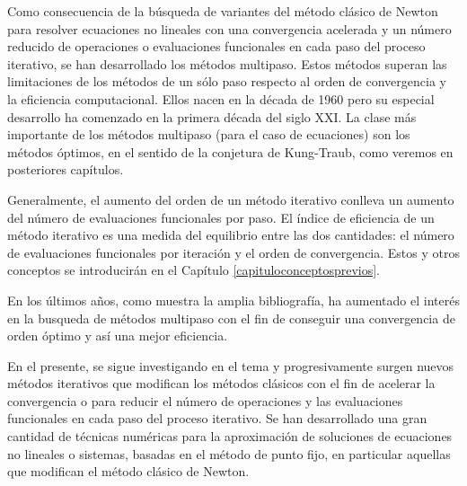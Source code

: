 Como consecuencia de la búsqueda de variantes del método clásico de Newton para resolver ecuaciones no
lineales con una convergencia acelerada y un número reducido de operaciones o evaluaciones funcionales en
cada paso del proceso iterativo, se han desarrollado los métodos multipaso. Estos métodos superan las limitaciones de los métodos de un sólo paso respecto al orden
de convergencia y la eficiencia computacional. Ellos nacen en la década de 1960 pero su especial desarrollo ha
comenzado en la primera década del siglo XXI. La clase más importante de los métodos multipaso (para el caso de ecuaciones) son los
métodos óptimos, en el sentido de la conjetura de Kung-Traub, como veremos en posteriores capítulos.

Generalmente, el aumento del orden de un método iterativo conlleva un aumento del número de evaluaciones
funcionales por paso. El índice de eficiencia de un método iterativo es una medida del equilibrio entre las dos cantidades: el número de
evaluaciones funcionales por iteración y el orden de convergencia. Estos y otros conceptos se introducirán en el Capítulo \ref{capituloconceptosprevios}.

En los últimos
años, como muestra la amplia bibliografía, ha aumentado el interés en la busqueda de métodos
multipaso con el fin de conseguir una convergencia de orden óptimo y así una mejor eficiencia.

En el presente, se sigue investigando en el tema y progresivamente surgen nuevos métodos iterativos que
modifican los métodos clásicos con el fin de acelerar la convergencia o para reducir el número de operaciones
y las evaluaciones funcionales en cada paso del proceso iterativo. Se han desarrollado una gran cantidad de
técnicas numéricas para la aproximación de soluciones de ecuaciones no lineales o sistemas, basadas en el método de punto
fijo, en particular aquellas que modifican el método clásico de Newton.

